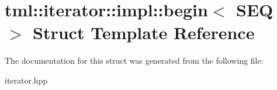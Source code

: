 \hypertarget{structtml_1_1iterator_1_1impl_1_1begin}{\section{tml\+:\+:iterator\+:\+:impl\+:\+:begin$<$ S\+E\+Q $>$ Struct Template Reference}
\label{structtml_1_1iterator_1_1impl_1_1begin}
}


The documentation for this struct was generated from the following file\+:\begin{DoxyCompactItemize}
\item 
iterator.\+hpp\end{DoxyCompactItemize}
